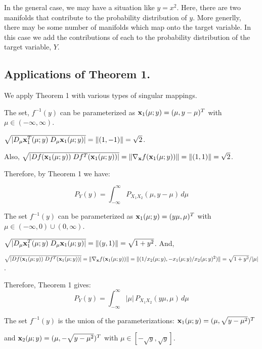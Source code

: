 In the general case, we may have a situation like $y = x^2$. 
Here, there are two manifolds that contribute to the probability distribution of $y$.
More generlly, there may be some number of manifolds which map 
onto the target variable. In this case we add the contributions of each 
to the probability distribution of the target variable, $Y$.


\subsection{Applications of Theorem 1.}
We apply Theorem 1 with various types of singular mappings.
\medskip


The set, $f^{-1}(y)$ can be
parameterized as ${\bf x}_1(\mu; y) = (\mu, y - \mu)^T$ with $\mu \in
(-\infty, \infty)$. 

$ \sqrt{|D_{\mu}{\bf x}_1^T(\mu; y)
\; D_{\mu}{\bf x}_1(\mu; y)|}
= \|(1,-1)\| = \sqrt{2}$. 

Also, $\sqrt{|Df({\bf x}_1(\mu; y)) \;
Df^T({\bf x}_1(\mu; y))|} = \| \nabla_{\bf x}
f({\bf x}_1(\mu; y)) \| = \|(1,1)\| = \sqrt{2}$. 

Therefore, by Theorem 1 we have:

$$
P_Y(y) = \int_{-\infty}^{\infty} P_{X_1 X_2}(\mu, y - \mu) \, d\mu
$$

The set $f^{-1}(y)$ can be
parameterized as ${\bf x}_1(\mu; y) = (y\mu, \mu)^T$ with $\mu \in
(-\infty, 0) \cup (0, \infty)$. 

$ \sqrt{|D_{\mu}{\bf x}_1^T(\mu; y)
\; D_{\mu}{\bf x}_1(\mu; y)|} =
\|(y,1)\| = \sqrt{1 + y^2}$. And,

$\sqrt{|Df({\bf x}_1(\mu; y)) \;
Df^T({\bf x}_1(\mu; y))|} = 
\|\nabla_{\bf x}
  f({\bf x}_1(\mu; y)) \| = \|
  (1/x_2(\mu; y), -x_1(\mu; y)/x_2(\mu; y)^2)\| = \sqrt{1 + y^2} / |\mu|$. 

Therefore, Theorem 1 gives:
$$
  P_Y(y) = \int_{-\infty}^{\infty} |\mu| \, P_{X_1 X_2}(y\mu, \mu) \, d\mu
$$


The set $f^{-1}(y)$ is the union of the 
parameterizations: ${\bf x}_1(\mu; y) = (\mu, \sqrt{y - \mu^2})^T$ 

and 
${\bf x}_2(\mu; y) = (\mu, - \sqrt{y - \mu^2})^T$ with $\mu \in
[-\sqrt{y}, \sqrt{y}]$. 
 
